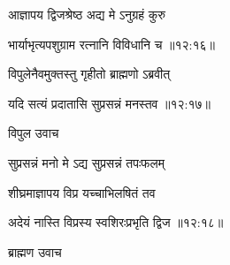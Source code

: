 {\devanagarifont आज्ञापय द्विजश्रेष्ठ अद्य मे ऽनुग्रहं कुरु \thinspace{\dandab} \dontdisplaylinenum }%


{\devanagarifont भार्याभृत्यपशुग्राम रत्नानि विविधानि च {॥१२:१६॥} \veg\dontdisplaylinenum }%

{\devanagarifont विपुलेनैवमुक्तस्तु गृहीतो ब्राह्मणो ऽब्रवीत् \thinspace{\dandab} \dontdisplaylinenum }%


{\devanagarifont यदि सत्यं प्रदातासि सुप्रसन्नं मनस्तव {॥१२:१७॥} \veg\dontdisplaylinenum }%

{\devanagarifont विपुल उवाच {\dandab}\dontdisplaylinenum  }%
 
{\devanagarifont सुप्रसन्नं मनो मे ऽद्य सुप्रसन्नं तपःफलम् \thinspace{\danda} \dontdisplaylinenum }%

{\devanagarifont शीघ्रमाज्ञापय विप्र यच्चाभिलषितं तव  \danda\dontdisplaylinenum }%


{\devanagarifont अदेयं नास्ति विप्रस्य स्वशिरःप्रभृति द्विज {॥१२:१८॥} \veg\dontdisplaylinenum }%

{\devanagarifont ब्राह्मण उवाच {\dandab}\dontdisplaylinenum  }%

